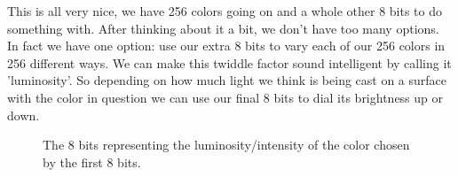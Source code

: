 This is all very nice, we have 256 colors going on and a whole other 8 bits to do something with. After thinking about it a bit, we don't
have too many options. In fact we have one option: use our extra 8 bits to vary each of our 256 colors in 256 different ways. We can make
this twiddle factor sound intelligent by calling it 'luminosity'. So depending on how much light we think is being cast on a surface with
the color in question we can use our final 8 bits to dial its brightness up or down.
\begin{figure}[H]
  {
    \setlength{\tabcolsep}{3.0pt}
    \setlength\cmidrulewidth{\lightrulewidth} %
    \begin{adjustbox}{width=10cm,center}
    \end{adjustbox}
  }\caption{The 8 bits representing the luminosity/intensity of the color chosen by the first 8 bits.}
\end{figure}


